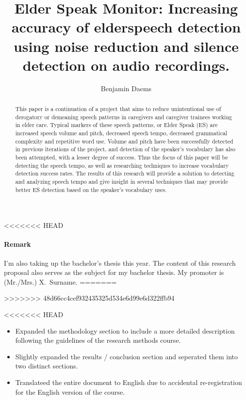 \documentclass[english]{hogent-article}
\title{Elder Speak Monitor: Increasing accuracy of elderspeech detection using noise reduction and silence detection on audio recordings.}
\author{Benjamin Daems}
\begin{document}
\begin{abstract}
This paper is a continuation of a project that aims to reduce unintentional use of derogatory or demeaning speech patterns in caregivers and caregiver trainees working in elder care.
Typical markers of these speech patterns, or Elder Speak (ES) are increased speech volume and pitch, decreased speech tempo, decreased grammatical complexity and repetitive word use.
Volume and pitch have been successfully detected in previous iterations of the project, and detection of the speaker's vocabulary has also been attempted, with a lesser degree of success.
Thus the focus of this paper will be detecting the speech tempo, as well as researching techniques to increase vocabulary detection success rates.
The results of this research will provide a solution to detecting and analyzing speech tempo and give insight in several techniques that may provide better ES detection based on the speaker's vocabulary uses. 
\end{abstract}

\tableofcontents

\bigskip


<<<<<<< HEAD
\paragraph{Remark}

I'm also taking up the bachelor's thesis this year. The content of this research proposal also serves as the subject for my bachelor thesis. My promoter is (Mr./Mrs.) X.\ Surname.
=======

>>>>>>> 48d66cc4cef932435325d534e6d99e6d322ffb94



<<<<<<< HEAD
\begin{itemize}
    \item Expanded the methodology section to include a more detailed description following the guidelines of the research methods course.
    \item Slightly expanded the results / conclusion section and seperated them into two distinct sections.
    \item Translateed the entire document to English due to accidental re-registration for the English version of the course.
\end{itemize}
\end{document}
